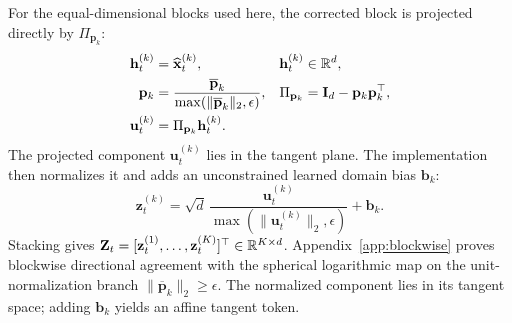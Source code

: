 For the equal-dimensional blocks used here, the corrected block is projected directly by $\Pi_{\mathbf p_k}$:
\begin{align}
\mathbf h_t^{(k)}&=\widehat{\mathbf x}_t^{(k)},
&\mathbf h_t^{(k)}&\in\mathbb{R}^d,
\label{eq:domain-alignment}\\
\mathbf p_k&=\frac{\overline{\mathbf p}_k}{\max(\|\overline{\mathbf p}_k\|_2,\epsilon)},
&\Pi_{\mathbf p_k}&=\mathbf I_d-\mathbf p_k\mathbf p_k^\top,
\label{eq:domain-basepoint}\\
\mathbf u_t^{(k)}&=\Pi_{\mathbf p_k}\mathbf h_t^{(k)}.
\label{eq:tangent-projection}
\end{align}
The projected component $\mathbf u_t^{(k)}$ lies in the tangent plane. The implementation then normalizes it and adds an unconstrained learned domain bias $\mathbf b_k$:
\begin{equation}
\mathbf z_t^{(k)}
=\sqrt d\,\frac{\mathbf u_t^{(k)}}{\max(\|\mathbf u_t^{(k)}\|_2,\epsilon)}
+\mathbf b_k.
\label{eq:token}
\end{equation}
Stacking gives $\mathbf Z_t=[\mathbf z_t^{(1)},\ldots,\mathbf z_t^{(K)}]^\top\in\mathbb{R}^{K\times d}$. Appendix~\ref{app:blockwise} proves blockwise directional agreement with the spherical logarithmic map on the unit-normalization branch $\|\overline{\mathbf p}_k\|_2\geq\epsilon$. The normalized component lies in its tangent space; adding $\mathbf b_k$ yields an affine tangent token.

